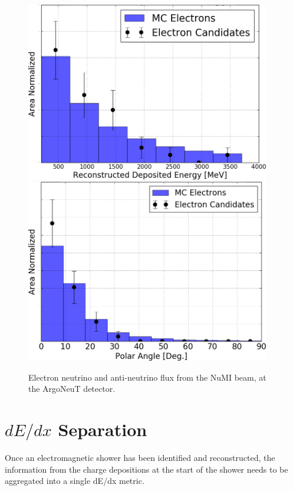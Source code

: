 \begin{figure}[htbp]
  \centering
  \includegraphics[width=0.95\textwidth]{emshower_figures/depE_corrected_trimmed.png}
  \includegraphics[width=0.95\textwidth]{emshower_figures/angle_comparison_trimmed.png}
  \caption{Electron neutrino and anti-neutrino flux from the NuMI beam, at the ArgoNeuT detector.}
  \label{fig:electron_kinematics}
\end{figure}

\section{\label{sec:dedx_sep} $dE/dx$ Separation}


Once an electromagnetic shower has been identified and reconstructed, the information from the charge depositions at the start of the shower needs to be aggregated into a single dE/dx metric. 

